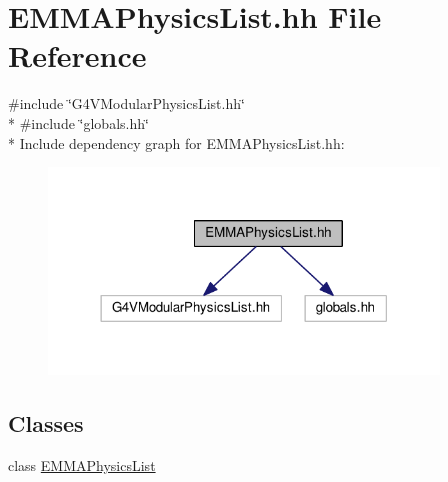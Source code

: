 \hypertarget{EMMAPhysicsList_8hh}{}\section{E\+M\+M\+A\+Physics\+List.\+hh File Reference}
\label{EMMAPhysicsList_8hh}
{\ttfamily \#include \char`\"{}G4\+V\+Modular\+Physics\+List.\+hh\char`\"{}}\\*
{\ttfamily \#include \char`\"{}globals.\+hh\char`\"{}}\\*
Include dependency graph for E\+M\+M\+A\+Physics\+List.\+hh\+:
\nopagebreak
\begin{figure}[H]
\begin{center}
\leavevmode
\includegraphics[width=294pt]{EMMAPhysicsList_8hh__incl}
\end{center}
\end{figure}
\subsection*{Classes}
\begin{DoxyCompactItemize}
\item 
class \hyperlink{classEMMAPhysicsList}{E\+M\+M\+A\+Physics\+List}
\end{DoxyCompactItemize}
